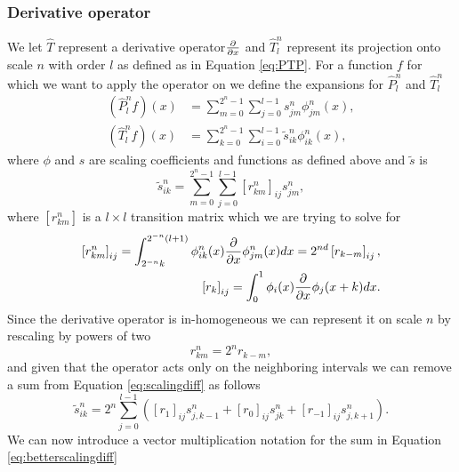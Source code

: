 \documentclass[../Thesis.tex]{subfiles}
\begin{document}
\subsubsection{Derivative operator}
We let $\hat{T}$ represent a derivative operator$\frac{\partial}{\partial x}$ and  $\hat{T}^n_{l}$
represent its projection onto scale $n$ with order $l$ as defined as in Equation
\ref{eq:PTP}. For a function $f$ for which we want to apply the operator on we
define the expansions for $\hat{P}^n_l$ and $\hat{T}^n_{l}$ \cite{Beylkin1999AdaptiveSO}
\begin{equation}
  \begin{aligned}
    \left(\hat{P}^{n}_{l} f\right)(x) &=\sum_{m=0}^{2^{n}-1} \sum_{j=0}^{l-1} s_{j m}^{n} \phi_{j m}^{n}(x), \\
    \left(\hat{T}^{n}_{l} f\right)(x) &=\sum_{k=0}^{2^{n}-1} \sum_{i=0}^{l-1} \tilde{s}_{i k}^{n} \phi_{i k}^{n}(x),
  \end{aligned}
\end{equation}
where $\phi$ and $s$ are scaling coefficients and functions as defined above and $\tilde{s}$ is
\begin{equation}\label{eq:scalingdiff}
\tilde{s}_{i k}^{n}=\sum_{m=0}^{2^{n}-1} \sum_{j=0}^{l-1}\left[r_{km}^{n}\right]_{i j} s_{j m}^{n},
\end{equation}
where $\left[r_{k m}^{n}\right]$ is a $l\times l$ transition matrix which we are
trying to solve for
\begin{align}
\left[r_{k m}^{n}\right]_{i j}=\int_{2^{-n} k}^{2^{-n}(l+1)} \phi_{i k}^{n}(x) \frac{\partial}{\partial x} \phi_{j m}^{n}(x) d x=2^{n d}\left[r_{k-m}\right]_{i j},\\
\left[r_{k}\right]_{i j}=\int_{0}^{1} \phi_{i}(x) \frac{\partial}{\partial x} \phi_{j}(x+k) d x.
\end{align}
Since the derivative operator is in-homogeneous we can represent it on scale $n$
by rescaling by powers of two
\begin{equation}
  r_{k m}^{n}=2^{n} r_{k-m},
\end{equation}
and given that the operator acts only on the neighboring intervals we can remove a sum from
Equation \ref{eq:scalingdiff} as follows
\begin{equation}\label{eq:betterscalingdiff}
\tilde{s}_{i k}^{n}=2^{n} \sum_{j=0}^{l-1}\left(\left[r_{1}\right]_{i j} s_{j, k-1}^{n}+\left[r_{0}\right]_{i j} s_{j k}^{n}+\left[r_{-1}\right]_{i j} s_{j, k+1}^{n}\right).
\end{equation}
We can now introduce a vector multiplication notation for the sum in Equation
\ref{eq:betterscalingdiff}
\end{document}
